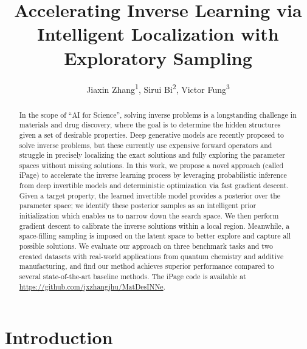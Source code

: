 \documentclass[letterpaper]{article} %
\title{Accelerating Inverse Learning via Intelligent Localization with \\ Exploratory Sampling}
\author {
    Jiaxin Zhang\textsuperscript{\rm 1},
    Sirui Bi\textsuperscript{\rm 2},
    Victor Fung\textsuperscript{\rm 3}
}
\begin{document}
\maketitle

\begin{abstract}
In the scope of ``AI for Science'', solving inverse problems is a longstanding challenge in materials and drug discovery, where the goal is to determine the hidden structures given a set of desirable properties. Deep generative models are recently proposed to solve inverse problems, but these currently use expensive forward operators and struggle in precisely localizing the exact solutions and fully exploring the parameter spaces without missing solutions. In this work, we propose a novel approach (called {iPage}) to accelerate the inverse learning process by leveraging probabilistic inference from deep invertible models and deterministic optimization via fast gradient descent. Given a target property, the learned invertible model provides a posterior over the parameter space; we identify these posterior samples as an intelligent prior initialization which enables us to narrow down the search space. We then perform gradient descent to calibrate the inverse solutions within a local region. Meanwhile, a space-filling sampling is imposed on the latent space to better explore and capture all possible solutions. We evaluate our approach on three benchmark tasks and two created datasets with real-world applications from quantum chemistry and additive manufacturing, and find our method achieves superior performance compared to several state-of-the-art baseline methods. The iPage code is available at \url{https://github.com/jxzhangjhu/MatDesINNe}.
\end{abstract}

\section{Introduction}
\label{intro}
\end{document}
